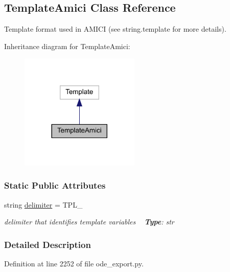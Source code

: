 \hypertarget{classamici_1_1ode__export_1_1_template_amici}{}\subsection{Template\+Amici Class Reference}
\label{classamici_1_1ode__export_1_1_template_amici}


Template format used in A\+M\+I\+CI (see string.\+template for more details).  




Inheritance diagram for Template\+Amici\+:
\nopagebreak
\begin{figure}[H]
\begin{center}
\leavevmode
\includegraphics[width=161pt]{classamici_1_1ode__export_1_1_template_amici__inherit__graph}
\end{center}
\end{figure}
\subsubsection*{Static Public Attributes}
\begin{DoxyCompactItemize}
\item 
\mbox{\label{classamici_1_1ode__export_1_1_template_amici_aacf4e58be14eef37272a71c004bc3f58}} 
string \mbox{\hyperlink{classamici_1_1ode__export_1_1_template_amici_aacf4e58be14eef37272a71c004bc3f58}{delimiter}} = \textquotesingle{}T\+P\+L\+\_\+\textquotesingle{}
\begin{DoxyCompactList}\small\item\em delimiter that identifies template variables ~\newline
{\bfseries Type}\+: str \end{DoxyCompactList}\end{DoxyCompactItemize}


\subsubsection{Detailed Description}


Definition at line 2252 of file ode\+\_\+export.\+py.


